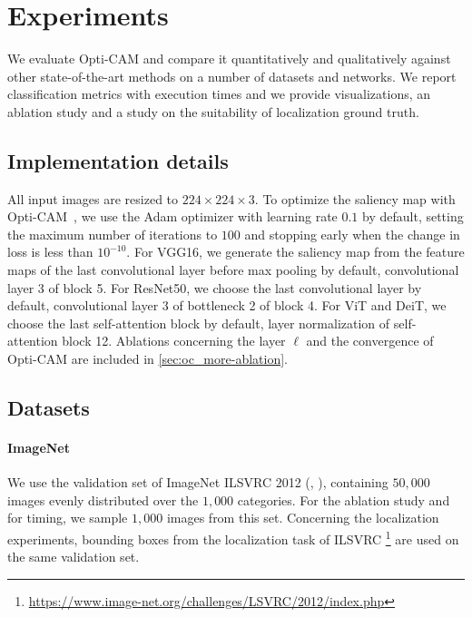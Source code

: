 \section{Experiments}
\label{sec:oc_exp}
We evaluate Opti-CAM and compare it quantitatively and qualitatively against other state-of-the-art 
methods on a number of datasets and networks. We report classification metrics with execution times 
and we provide visualizations, an ablation study and a study on the suitability of localization 
ground truth.

\subsection{Implementation details}
\label{sec:oc_details}

All input images are resized to $224 \times 224 \times 3$. To optimize the saliency map with 
Opti-CAM~, we use the Adam \autocite{kingma2014adam} optimizer with learning rate $0.1$ by 
default, setting the maximum number of iterations to $100$ and stopping early when the change in 
loss is less than $10^{-10}$. For VGG16, we generate the saliency map  from the feature 
maps of the last convolutional layer before max pooling by default, \ie convolutional layer 3 of 
block 5. For ResNet50, we choose the last convolutional layer by default, \ie convolutional layer 3 
of bottleneck 2 of block 4. For ViT and DeiT, we choose the last self-attention block by default, 
\ie layer normalization of self-attention block 12. Ablations concerning the layer $\ell$ and the 
convergence of Opti-CAM are included in \autoref{sec:oc_more-ablation}.

\subsection{Datasets}
\label{sec:oc_data}

\paragraph{ImageNet}
We use the validation set of ImageNet ILSVRC 2012 (\cite{krizhevsky2012imagenet}, \cite{ILSVRC15}), 
containing $50,000$ images evenly distributed over the $1,000$ categories. For the ablation study 
and for timing, we sample $1,000$ images from this set. Concerning the localization experiments, 
bounding boxes from the localization task of ILSVRC
\footnote{\url{https://www.image-net.org/challenges/LSVRC/2012/index.php}} are used on the same 
validation set.

